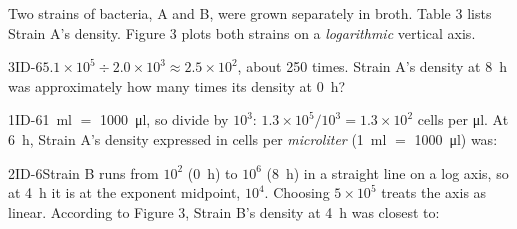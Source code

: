 \documentclass[11pt]{article}
\begin{document}
Two strains of bacteria, A and B, were grown separately in broth. Table 3 lists Strain A's density. Figure 3 plots both strains on a \emph{logarithmic} vertical axis.

\begin{minipage}[c]{0.40\linewidth}
\end{minipage}\hfill
\begin{minipage}[c]{0.57\linewidth}
\centering
{}
\end{minipage}
\passageend

\begin{q}{3}{ID-6}{$5.1\times10^{5} \div 2.0\times10^{3} \approx 2.5\times10^{2}$, about 250 times.}
Strain A's density at \SI{8}{\hour} was approximately how many times its density at \SI{0}{\hour}?
\end{q}

\begin{q}{1}{ID-6}{\SI{1}{\milli\litre} $=$ \SI{1000}{\micro\litre}, so divide by $10^{3}$: $1.3\times10^{5}/10^{3}=1.3\times10^{2}$ cells per \si{\micro\litre}.}
At \SI{6}{\hour}, Strain A's density expressed in cells per \emph{microliter} (\SI{1}{\milli\litre} $=$ \SI{1000}{\micro\litre}) was:
\end{q}

\begin{q}{2}{ID-6}{Strain B runs from $10^{2}$ (\SI{0}{\hour}) to $10^{6}$ (\SI{8}{\hour}) in a straight line on a log axis, so at \SI{4}{\hour} it is at the exponent midpoint, $10^{4}$. Choosing $5\times10^{5}$ treats the axis as linear.}
According to Figure 3, Strain B's density at \SI{4}{\hour} was closest to:
\end{q}
\end{document}
